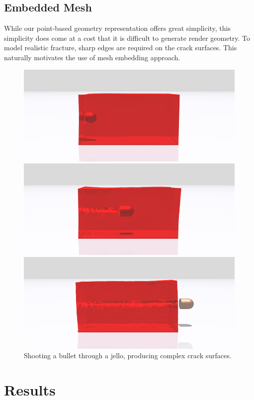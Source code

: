 \subsection{Embedded Mesh}

While our point-based geometry representation offers great simplicity, this simplicity does come at a cost that it is difficult to generate render geometry. To model realistic fracture, sharp edges are required on the crack surfaces. This naturally motivates the use of mesh embedding approach.

\begin{figure}[t]
  \centering
  \includegraphics[width=\linewidth]{./figs/demo_jello.png}
  \caption{\label{fig:6}
  Shooting a bullet through a jello, producing complex crack surfaces.
}
\end{figure}

\section{Results}

